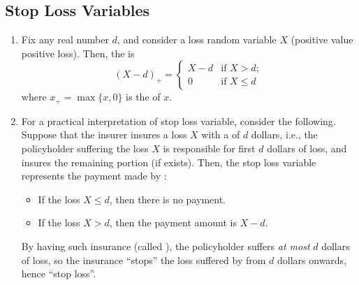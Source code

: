 \subsection{Stop Loss Variables}
\begin{enumerate}
\item Fix any real number \(d\), and consider a loss  random
variable \(X\) (positive value  positive loss).  Then, the
 is 
\[
(X-d)_{+}=\begin{cases}
X-d&\text{if }X> d;\\
0&\text{if }X\le d
\end{cases}
\]
where \(x_{+}=\max\{x,0\}\) is the  of \(x\).

\item For a practical interpretation of stop loss variable, consider the
following. Suppose that the insurer  insures a loss \(X\) with
a  of \(d\) dollars, i.e., the policyholder 
suffering the loss \(X\) is responsible for first \(d\) dollars of loss, and
 insures the remaining portion (if exists). Then, the stop
loss variable represents the payment made by :
\begin{itemize}
\item If the loss \(X\le d\), then there is no payment.
\item If the loss \(X>d\), then the payment amount is \(X-d\).
\end{itemize}
\begin{note}
By having such insurance (called ), the policyholder
 suffers \emph{at most} \(d\) dollars of loss, so the insurance
``stops'' the loss suffered by  from \(d\) dollars onwards, hence
``stop loss''.
\end{note}


\end{enumerate}
